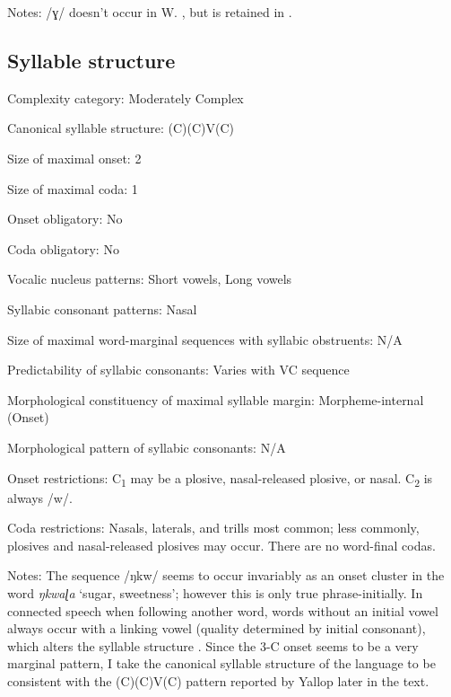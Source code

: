 {\begin{appendixdesc}
\item[Notes:] /ɣ/ doesn’t occur in W. , but is retained in  \citep[12]{Yallop1977}.
\end{appendixdesc}
\subsection*{Syllable structure}
\begin{appendixdesc}

\item[Complexity category:] Moderately Complex

\item[Canonical syllable structure:] (C)(C)V(C) \citep[41--45]{Yallop1977}

\item[Size of maximal onset:] 2

\item[Size of maximal coda:] 1

\item[Onset obligatory:] No

\item[Coda obligatory:] No

\item[Vocalic nucleus patterns:] Short vowels, Long vowels

\item[Syllabic consonant patterns:] Nasal

\item[Size of maximal word-marginal sequences with syllabic obstruents:] N/A

\item[Predictability of syllabic consonants:] Varies with VC sequence

\item[Morphological constituency of maximal syllable margin:] Morpheme-internal (Onset)

\item[Morphological pattern of syllabic consonants:] N/A

\item[Onset restrictions:] C\textsubscript{1} may be a plosive, nasal-released plosive, or nasal. C\textsubscript{2} is always /w/.

\item[Coda restrictions:] Nasals, laterals, and trills most common; less commonly, plosives and nasal-released plosives may occur. There are no word-final codas.

\item[Notes:] The sequence /ŋkw/ seems to occur invariably as an onset cluster in the word \textit{ŋkwaɭa} ‘sugar, sweetness’; however this is only true phrase-initially. In connected speech when following another word, words without an initial vowel always occur with a linking vowel (quality determined by initial consonant), which alters the syllable structure \citep[28--30]{Yallop1977}. Since the 3-C onset seems to be a very marginal pattern, I take the canonical syllable structure of the language to be consistent with the (C)(C)V(C) pattern reported by Yallop later in the text.
\end{appendixdesc}
}
